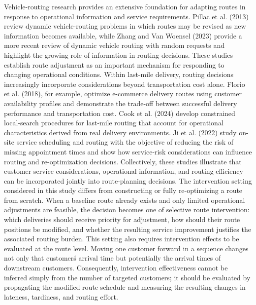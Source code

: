 \documentclass[11pt,a4paper]{article}
\begin{document}
Vehicle-routing research provides an extensive foundation for adapting
routes in response to operational information and service requirements.
Pillac et al. (2013) review dynamic vehicle-routing problems in which
routes may be revised as new information becomes available, while Zhang
and Van Woensel (2023) provide a more recent review of dynamic vehicle
routing with random requests and highlight the growing role of
information in routing decisions. These studies establish route
adjustment as an important mechanism for responding to changing
operational conditions. Within last-mile delivery, routing decisions
increasingly incorporate considerations beyond transportation cost
alone. Florio et al. (2018), for example, optimize e-commerce delivery
routes using customer availability profiles and demonstrate the
trade-off between successful delivery performance and transportation
cost. Cook et al. (2024) develop constrained local-search procedures for
last-mile routing that account for operational characteristics derived
from real delivery environments. Ji et al. (2022) study on-site service
scheduling and routing with the objective of reducing the risk of
missing appointment times and show how service-risk considerations can
influence routing and re-optimization decisions. Collectively, these
studies illustrate that customer service considerations, operational
information, and routing efficiency can be incorporated jointly into
route-planning decisions. The intervention setting considered in this
study differs from constructing or fully re-optimizing a route from
scratch. When a baseline route already exists and only limited
operational adjustments are feasible, the decision becomes one of
selective route intervention: which deliveries should receive priority
for adjustment, how should their route positions be modified, and
whether the resulting service improvement justifies the associated
routing burden. This setting also requires intervention effects to be
evaluated at the route level. Moving one customer forward in a sequence
changes not only that customer\'s arrival time but
potentially the arrival times of downstream customers. Consequently,
intervention effectiveness cannot be inferred simply from the number of
targeted customers; it should be evaluated by propagating the modified
route schedule and measuring the resulting changes in lateness,
tardiness, and routing effort.
\end{document}
